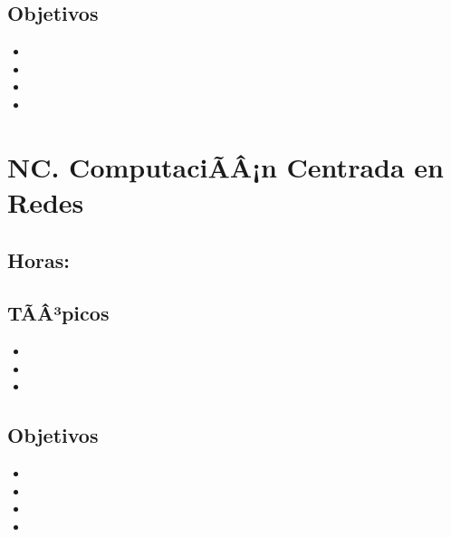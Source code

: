 \subsection*{Objetivos}
\begin{itemize}
	\item \OSDOCEObjUNO
	\item \OSDOCEObjDOS
	\item \OSDOCEObjTRES
	\item \OSDOCEObjCUATRO
\end{itemize}

\section{NC. ComputaciÃÂ¡n Centrada en Redes}\label{sec:BOK-NC}

\subsection{\NCUNODef}\label{sec:BOK-NC1}
\subsection*{Horas: \NCUNOHours}

\subsection*{TÃÂ³picos}
\begin{itemize}
	\item \NCUNOTopicHistoria
	\item \NCUNOTopicArquitecturas
	\item \NCUNOTopicEspecializaciones
\end{itemize}

\subsection*{Objetivos}
\begin{itemize}
	\item \NCUNOObjUNO
	\item \NCUNOObjDOS
	\item \NCUNOObjTRES
	\item \NCUNOObjCUATRO
\end{itemize}

\subsection{\NCDOSDef}\label{sec:BOK-NC2}
